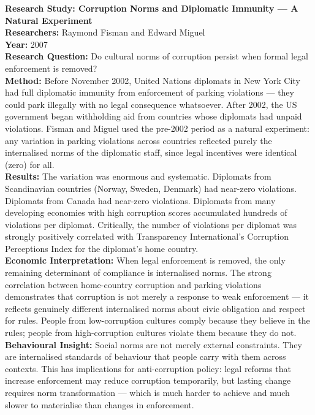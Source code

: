 \documentclass[12pt, letterpaper]{article}
\begin{document}
\begin{researchbox}
\textbf{Research Study: Corruption Norms and Diplomatic Immunity --- A Natural Experiment}\\[4pt]

\textbf{Researchers:} Raymond Fisman and Edward Miguel\\[4pt]
\textbf{Year:} 2007\\[4pt]
\textbf{Research Question:} Do cultural norms of corruption persist when formal legal enforcement is removed?\\[4pt]
\textbf{Method:} Before November 2002, United Nations diplomats in New York City had full diplomatic immunity from enforcement of parking violations --- they could park illegally with no legal consequence whatsoever. After 2002, the US government began withholding aid from countries whose diplomats had unpaid violations. Fisman and Miguel used the pre-2002 period as a natural experiment: any variation in parking violations across countries reflected purely the internalised norms of the diplomatic staff, since legal incentives were identical (zero) for all.\\[4pt]
\textbf{Results:} The variation was enormous and systematic. Diplomats from Scandinavian countries (Norway, Sweden, Denmark) had near-zero violations. Diplomats from Canada had near-zero violations. Diplomats from many developing economies with high corruption scores accumulated hundreds of violations per diplomat. Critically, the number of violations per diplomat was strongly positively correlated with Transparency International's Corruption Perceptions Index for the diplomat's home country.\\[4pt]
\textbf{Economic Interpretation:} When legal enforcement is removed, the only remaining determinant of compliance is internalised norms. The strong correlation between home-country corruption and parking violations demonstrates that corruption is not merely a response to weak enforcement --- it reflects genuinely different internalised norms about civic obligation and respect for rules. People from low-corruption cultures comply because they believe in the rules; people from high-corruption cultures violate them because they do not.\\[4pt]
\textbf{Behavioural Insight:} Social norms are not merely external constraints. They are internalised standards of behaviour that people carry with them across contexts. This has implications for anti-corruption policy: legal reforms that increase enforcement may reduce corruption temporarily, but lasting change requires norm transformation --- which is much harder to achieve and much slower to materialise than changes in enforcement.\\[4pt]
\end{researchbox}
\end{document}
